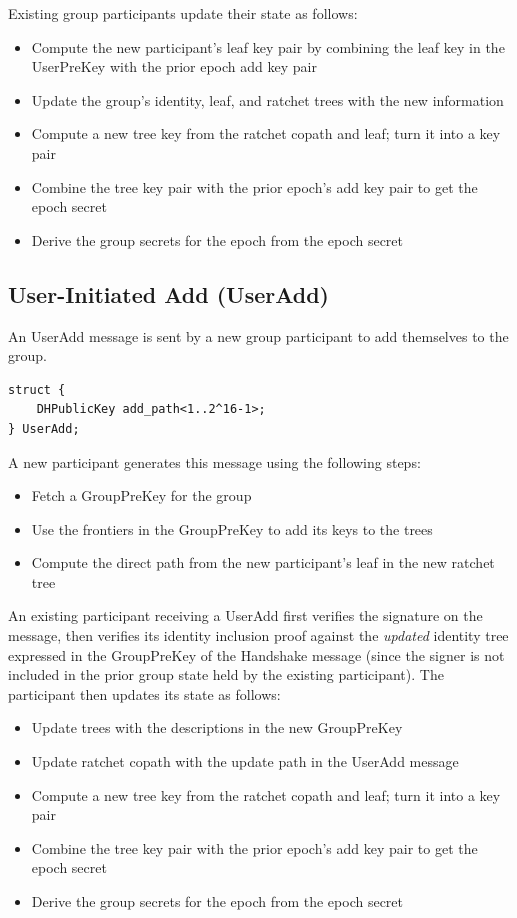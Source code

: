 \documentclass[11pt, oneside]{article}
\begin{document}
Existing group participants update their state as follows:

\begin{itemize}
\item{Compute the new participant's leaf key pair by combining the leaf key in the UserPreKey with the prior epoch add key pair}
\item{Update the group's identity, leaf, and ratchet trees with the new information}
\item{Compute a new tree key from the ratchet copath and leaf; turn it into a key pair}
\item{Combine the tree key pair with the prior epoch's add key pair to get the epoch secret}
\item{Derive the group secrets for the epoch from the epoch secret}
\end{itemize}


\subsection{User-Initiated Add (UserAdd)}

An UserAdd message is sent by a new group participant to add themselves to the group.

\begin{verbatim}
struct {
    DHPublicKey add_path<1..2^16-1>;
} UserAdd;
\end{verbatim}

A new participant generates this message using the following steps:

\begin{itemize}
\item{Fetch a GroupPreKey for the group}
\item{Use the frontiers in the GroupPreKey to add its keys to the trees}
\item{Compute the direct path from the new participant's leaf in the new ratchet tree}
\end{itemize}

An existing participant receiving a UserAdd first verifies the signature on the message, then verifies its identity inclusion proof against the \emph{updated} identity tree expressed in the GroupPreKey of the Handshake message (since the signer is not included in the prior group state held by the existing participant).  The participant then updates its state as follows:

\begin{itemize}
\item{Update trees with the descriptions in the new GroupPreKey}
\item{Update ratchet copath with the update path in the UserAdd message}
\item{Compute a new tree key from the ratchet copath and leaf; turn it into a key pair}
\item{Combine the tree key pair with the prior epoch's add key pair to get the epoch secret}
\item{Derive the group secrets for the epoch from the epoch secret}
\end{itemize}
\end{document}

